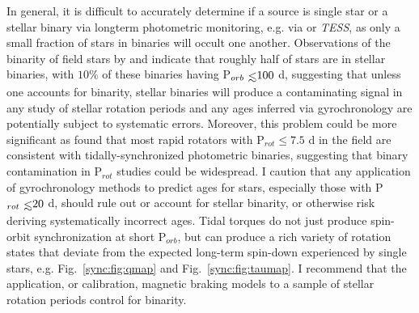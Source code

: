 In general, it is difficult to accurately determine if a source is single star or a stellar binary via longterm photometric monitoring, e.g. via \kepler or \textit{TESS}, as only a small fraction of stars in binaries will occult one another. Observations of the binarity of field stars by \citet{Raghavan2010} and \citet{Duchene2013} indicate that roughly half of stars are in stellar binaries, with $10\%$ of these binaries having P$_{orb} \lsim 100$ d, suggesting that unless one accounts for binarity, stellar binaries will produce a contaminating signal in any study of stellar rotation periods and any ages inferred via gyrochronology are potentially subject to systematic errors.  Moreover, this problem could be more significant as \citet{Simonian2018} found that most rapid rotators with P$_{rot} \leq 7.5$ d in the \kepler field are consistent with tidally-synchronized photometric binaries, suggesting that binary contamination in P$_{rot}$ studies could be widespread. I caution that any application of gyrochronology methods to predict ages for stars, especially those with P$_{rot} \lsim 20$ d, should rule out or account for stellar binarity, or otherwise risk deriving systematically incorrect ages. Tidal torques do not just produce spin-orbit synchronization at short P$_{orb}$, but can produce a rich variety of rotation states that deviate from the expected long-term spin-down experienced by single stars, e.g. Fig.~\ref{sync:fig:qmap} and Fig.~\ref{sync:fig:taumap}. I recommend that the application, or calibration, magnetic braking models to a sample of stellar rotation periods control for binarity.   




